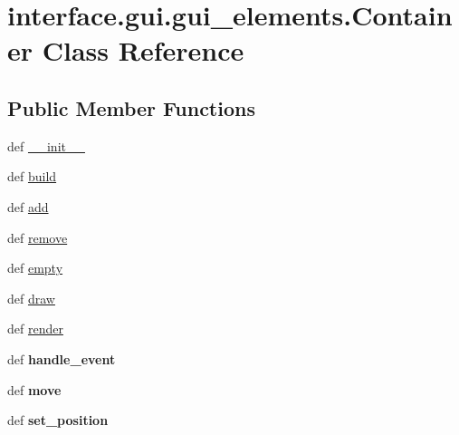 \hypertarget{classinterface_1_1gui_1_1gui__elements_1_1_container}{\section{interface.\-gui.\-gui\-\_\-elements.\-Container \-Class \-Reference}
\label{classinterface_1_1gui_1_1gui__elements_1_1_container}
}
\subsection*{\-Public \-Member \-Functions}
\begin{DoxyCompactItemize}
\item 
def \hyperlink{classinterface_1_1gui_1_1gui__elements_1_1_container_a2f8773dacbb9b1ade652adb2c5ec3e51}{\-\_\-\-\_\-init\-\_\-\-\_\-}
\item 
def \hyperlink{classinterface_1_1gui_1_1gui__elements_1_1_container_a63efaf716bdb739e8285ad8c6da14c09}{build}
\item 
def \hyperlink{classinterface_1_1gui_1_1gui__elements_1_1_container_a8d7c627b24c729f7b9d608ffcd01972e}{add}
\item 
def \hyperlink{classinterface_1_1gui_1_1gui__elements_1_1_container_a43d337a46ba5dfa57141f0219df4ef19}{remove}
\item 
def \hyperlink{classinterface_1_1gui_1_1gui__elements_1_1_container_a495910cc933c39d7ea49c6a4a613a955}{empty}
\item 
def \hyperlink{classinterface_1_1gui_1_1gui__elements_1_1_container_a41917ac555d50b7704ddec29b49e58eb}{draw}
\item 
def \hyperlink{classinterface_1_1gui_1_1gui__elements_1_1_container_a364895e69eea366fdbfd7504b08a7593}{render}
\item 
\hypertarget{classinterface_1_1gui_1_1gui__elements_1_1_container_a6fdf4ce891569100c90e350bf821ac66}{def {\bfseries handle\-\_\-event}}\label{classinterface_1_1gui_1_1gui__elements_1_1_container_a6fdf4ce891569100c90e350bf821ac66}

\item 
\hypertarget{classinterface_1_1gui_1_1gui__elements_1_1_container_a0089943fea0a17ff151866c5e133692c}{def {\bfseries move}}\label{classinterface_1_1gui_1_1gui__elements_1_1_container_a0089943fea0a17ff151866c5e133692c}

\item 
\hypertarget{classinterface_1_1gui_1_1gui__elements_1_1_container_afff9293d3be80933910bee70430d0f5e}{def {\bfseries set\-\_\-position}}\label{classinterface_1_1gui_1_1gui__elements_1_1_container_afff9293d3be80933910bee70430d0f5e}

\end{DoxyCompactItemize}
